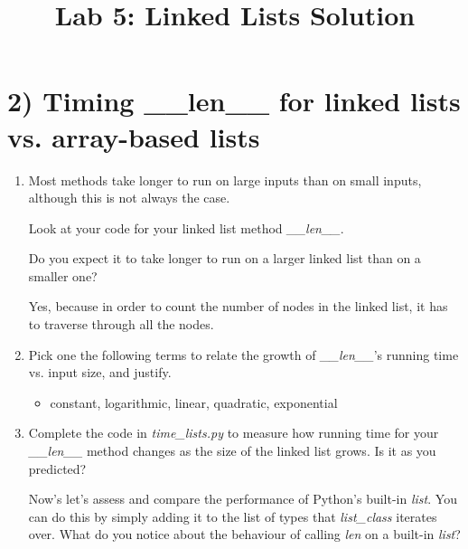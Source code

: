 \documentclass[12pt]{article}
\begin{document}
\title{Lab 5: Linked Lists Solution}
\date{}
\maketitle

\section*{2) Timing \_\_len\_\_ for linked lists vs. array-based lists}

\begin{enumerate}[1.]
    \item Most methods take longer to run on large inputs than on small inputs,
    although this is not always the case.

    \bigskip

    Look at your code for your linked list method \textit{\_\_len\_\_}.

    Do you expect it to take longer to run on a larger
    linked list than on a smaller one?

    \bigskip

    \begin{mdframed}
    Yes, because in order to count the number of nodes in the linked list,
    it has to traverse through all the nodes.
    \end{mdframed}

    \item Pick one the following terms to relate the growth of \textit{\_\_len\_\_}'s
    running time vs. input size, and justify.
    \begin{itemize}
        \item constant, logarithmic, linear, quadratic, exponential
    \end{itemize}

    \item Complete the code in \textit{time\_lists.py} to measure how running
    time for your \textit{\_\_len\_\_} method changes as the size of the linked
    list grows. Is it as you predicted?

    \bigskip

    Now’s let’s assess and compare the performance of Python’s built-in \textit{list}.
    You can do this by simply adding it to the list of types that \textit{list\_class}
    iterates over. What do you notice about the behaviour of calling \textit{len} on
    a built-in \textit{list}?

\end{enumerate}
\end{document}
